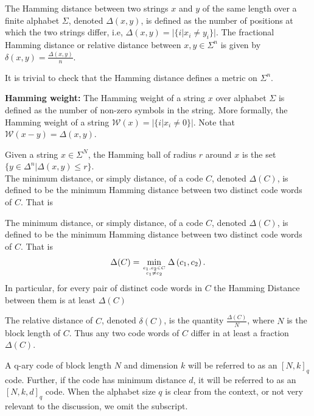 \begin{definition}
  The Hamming distance between two strings $x$ and $y$ of the same length over a finite alphabet $\Sigma$, denoted $\Delta(x,y)$, is defined as the number of positions at which the two strings differ, i.e, $\Delta(x,y) = |\{i| x_i \neq y_i\}|$. The fractional Hamming distance or relative distance between $x,y\in \Sigma^n$ is given by $\delta(x,y) = \frac{\Delta(x,y)}{n}$.
 \end{definition}
It is trivial to check that the Hamming distance defines a metric on $\Sigma^n$.
\begin{definition}
\textbf{Hamming weight:} The Hamming weight of a string $x$ over alphabet $\Sigma$ is defined as the number of non-zero symbols in the string. More formally, the Hamming weight of a string $\mathcal{W}(x) = |\{i| x_i \neq 0\}|$. Note that $\mathcal{W}(x-y) = \Delta(x,y)$.
\end{definition}
Given a string $x\in\Sigma^{N}$, the Hamming ball of radius $r$ around $x$ is the set $\{y\in\Delta^n | \Delta(x,y)\leq r\}$.\\
The minimum distance, or simply distance, of a code $C$, denoted $\Delta(C)$, is defined to be the minimum Hamming distance between two distinct code words of $C$. That is
\begin{definition}
 The minimum distance, or simply distance, of a code $C$, denoted $\Delta(C)$, is defined to be the minimum Hamming distance between two distinct code words of $C$. That is
\begin{equation}
\Delta(C)=\min _{c_{1}, c_{2} \in C \atop c_{1} \neq c_{2}} \Delta\left(c_{1}, c_{2}\right).
\end{equation}
In particular, for every pair of distinct code words in $C$ the Hamming Distance between them is at least $\Delta(C)$
\end{definition}

The relative distance of $C$, denoted $\delta(C)$, is the quantity $\frac{\Delta(C)}{N}$, where $N$ is the block length of $C$. Thus any two code words of $C$ differ in at least a fraction $\Delta(C)$.
\begin{definition}[Notation]
 A q-ary code of block length $N$ and dimension $k$ will be referred to as an $[N,k]_q$ code. Further, if the code has minimum distance $d$, it will be referred to as an $[N,k,d]_q$ code. When the alphabet size $q$ is clear from the context, or not very relevant to the discussion, we omit the subscript.
\end{definition}

